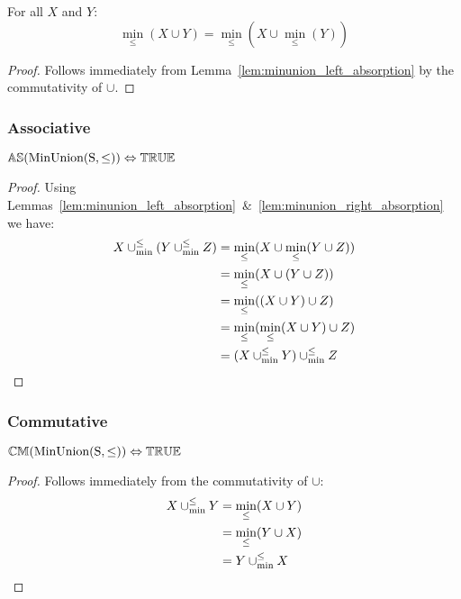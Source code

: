 \documentclass[../Summary.tex]{subfiles}
\begin{document}
\vspace{2em}


\begin{lemma} \label{lem:minunion_right_absorption}
For all $X$ and $Y$:
\begin{equation}
\min_\leq(X \cup Y) = \min_\leq(X \cup \min_\leq(Y))
\end{equation}
\end{lemma}

\begin{proof}
Follows immediately from Lemma~\ref{lem:minunion_left_absorption} by the commutativity of $\cup$.
\end{proof}



\subsubsection{Associative}

\begin{theorem} \label{thm:minunion_as}
${\mathbb{AS}}(\mathrm{MinUnion(S,\leq)}) \Leftrightarrow {\mathbb{TRUE}}$
\end{theorem}

\begin{proof}
Using Lemmas~\ref{lem:minunion_left_absorption}~\&~\ref{lem:minunion_right_absorption} we have:
\begin{align*}
X \mathbin{\cup_{\min}^{\leq}} (Y \mathbin{\cup_{\min}^{\leq}} Z) & = \min_\leq(X \cup \min_\leq(Y \cup Z)) \\
							& = \min_\leq(X \cup (Y \cup Z)) \\
							& = \min_\leq((X \cup Y) \cup Z) \\
							& = \min_\leq(\min_\leq(X \cup Y) \cup Z) \\
							& = (X \mathbin{\cup_{\min}^{\leq}} Y) \mathbin{\cup_{\min}^{\leq}} Z
\end{align*}
\end{proof}




\subsubsection{Commutative}

\begin{theorem} \label{thm:minunion_cm}
${\mathbb{CM}}(\mathrm{MinUnion(S,\leq)}) \Leftrightarrow {\mathbb{TRUE}}$
\end{theorem}

\begin{proof}
Follows immediately from the commutativity of $\cup$:
\begin{align*}
X \mathbin{\cup_{\min}^{\leq}} Y 	& = \min_\leq(X \cup Y) \\
				& = \min_\leq(Y \cup X) \\
				& = Y \mathbin{\cup_{\min}^{\leq}} X
\end{align*}
\end{proof}
\end{document}

